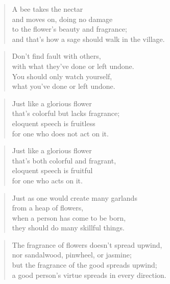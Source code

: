 \documentclass[12pt,openany]{book}%
\begin{document}
\begin{verse}%
A bee takes the nectar \\
and moves on, doing no damage \\
to the flower’s beauty and fragrance; \\
and that’s how a sage should walk in the village. 

%
\end{verse}

\begin{verse}%
Don’t find fault with others, \\
with what they’ve done or left undone. \\
You should only watch yourself, \\
what you’ve done or left undone. 

%
\end{verse}

\begin{verse}%
Just like a glorious flower \\
that’s colorful but lacks fragrance; \\
eloquent speech is fruitless \\
for one who does not act on it. 

%
\end{verse}

\begin{verse}%
Just like a glorious flower \\
that’s both colorful and fragrant, \\
eloquent speech is fruitful \\
for one who acts on it. 

%
\end{verse}

\begin{verse}%
Just as one would create many garlands \\
from a heap of flowers, \\
when a person has come to be born, \\
they should do many skillful things. 

%
\end{verse}

\begin{verse}%
The fragrance of flowers doesn’t spread upwind, \\
nor sandalwood, pinwheel, or jasmine; \\
but the fragrance of the good spreads upwind; \\
a good person’s virtue spreads in every direction. 

%
\end{verse}
\end{document}
